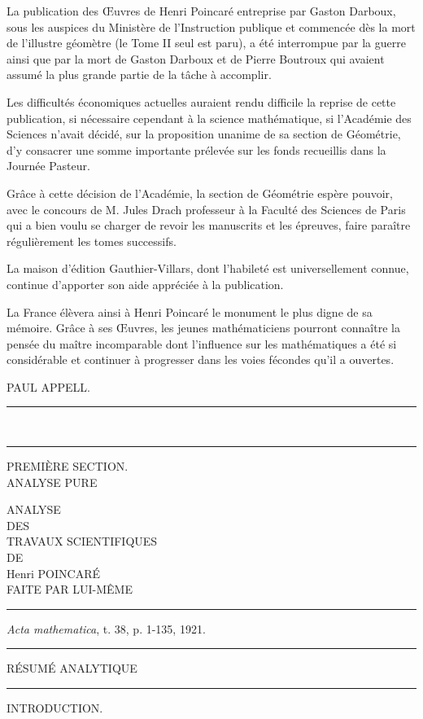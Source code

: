 \documentclass[11pt]{article}
\newcommand{\ornament}{\begin{center}\rule{2.5em}{0.4pt}\,\raisebox{0.1ex}{\tiny$\bullet\bullet\bullet$}\,\rule{2.5em}{0.4pt}\end{center}}
\newcommand{\shortline}{\begin{center}\rule{3.5em}{0.4pt}\end{center}}
\begin{document}
La publication des Œuvres de Henri Poincaré entreprise par Gaston Darboux, sous les auspices du Ministère de l’Instruction publique et commencée dès la mort de l’illustre géomètre (le Tome II seul est paru), a été interrompue par la guerre ainsi que par la mort de Gaston Darboux et de Pierre Boutroux qui avaient assumé la plus grande partie de la tâche à accomplir.

Les difficultés économiques actuelles auraient rendu difficile la reprise de cette publication, si nécessaire cependant à la science mathématique, si l’Académie des Sciences n’avait décidé, sur la proposition unanime de sa section de Géométrie, d’y consacrer une somme importante prélevée sur les fonds recueillis dans la Journée Pasteur.

Grâce à cette décision de l’Académie, la section de Géométrie espère pouvoir, avec le concours de M. Jules Drach professeur à la Faculté des Sciences de Paris qui a bien voulu se charger de revoir les manuscrits et les épreuves, faire paraître régulièrement les tomes successifs.

La maison d’édition Gauthier-Villars, dont l’habileté est universellement connue, continue d’apporter son aide appréciée à la publication.

La France élèvera ainsi à Henri Poincaré le monument le plus digne de sa mémoire. Grâce à ses Œuvres, les jeunes mathématiciens pourront connaître la pensée du maître incomparable dont l’influence sur les mathématiques a été si considérable et continuer à progresser dans les voies fécondes qu’il a ouvertes.

\begin{flushright}
PAUL APPELL.
\end{flushright}
\ornament
\clearpage

\begin{center}
{\small PREMIÈRE SECTION.}\\[1.4em]
{\Large ANALYSE PURE}
\end{center}
\clearpage

\begin{center}
{\Large ANALYSE}\\[0.6em]
{\small DES}\\[0.6em]
{\huge TRAVAUX SCIENTIFIQUES}\\[0.7em]
{\small DE}\\[0.5em]
{\large Henri POINCARÉ}\\[0.5em]
{\small FAITE PAR LUI-MÊME}\\[0.8em]
\shortline
\emph{Acta mathematica}, t. 38, p. 1-135, 1921.\\
\shortline
{\Large RÉSUMÉ ANALYTIQUE}\\[0.8em]
\shortline
{\large INTRODUCTION.}
\end{center}
\end{document}

